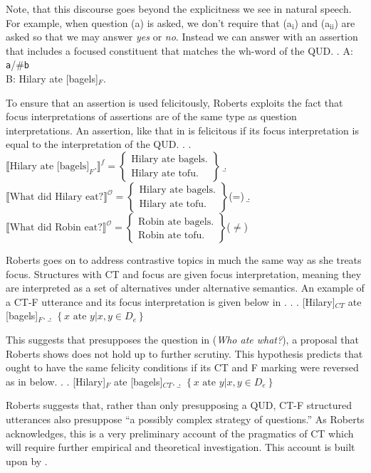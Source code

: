\documentclass[GPFinal]{subfiles}
\begin{document}
Note, that this discourse goes beyond the explicitness we see in natural speech.
For example, when question (a) is asked, we don't require that (a$_\text{i}$) and (a$_\text{ii}$) are asked so that we may answer \textit{yes} or \textit{no}.
Instead we can answer with an assertion that includes a focused constituent that matches the wh-word of the QUD.
\ex. A: \texttt{a}/\#\texttt{b}\\
B: Hilary ate [bagels]$_F$.

To ensure that an assertion is used felicitously, Roberts exploits the fact that focus interpretations of assertions are of the same type as question interpretations.
An assertion, like that in \Last is felicitous if its focus interpretation is equal to the interpretation of the QUD.
\ex.
\a.
$\llbracket\text{Hilary ate [bagels]}_F.\rrbracket^f = 
\begin{Bmatrix}
  \text{Hilary ate bagels.}\\
  \text{Hilary ate tofu.}
\end{Bmatrix}
$
\b.
$\llbracket\text{What did Hilary eat?}\rrbracket^\mathcal{O} =
\begin{Bmatrix}
  \text{Hilary ate bagels.}\\
  \text{Hilary ate tofu.}
\end{Bmatrix}
$\hfill (=\Last[a])
\b.
$\llbracket\text{What did Robin eat?}\rrbracket^\mathcal{O} =
\begin{Bmatrix}
  \text{Robin ate bagels.}\\
  \text{Robin ate tofu.}
\end{Bmatrix}
$\hfill ($\neq$\Last[a])

Roberts goes on to address contrastive topics in much the same way as she treats focus.
Structures with CT and focus are given focus interpretation, meaning they are interpreted as a set of alternatives under alternative semantics.
An example of a CT-F utterance and its focus interpretation is given below in \Next.
\ex.
\a. [Hilary]$_{CT}$ ate [bagels]$_F$.
\b. $\left\{ x\text{ ate }y | x,y \in D_e \right\}$

This suggests that \Last[a] presupposes the question in \Last[b] (\textit{Who ate what?}), a proposal that Roberts shows does not hold up to further scrutiny.
This hypothesis predicts that \Last[a] ought to have the same felicity conditions if its CT and F marking were reversed as in \Next below.
\ex. 
\a. [Hilary]$_F$ ate [bagels]$_{CT}$.
\b. $\left\{ x\text{ ate }y | x,y \in D_e \right\}$

Roberts suggests that, rather than only presupposing a QUD, CT-F structured utterances also presuppose ``a possibly complex strategy of questions.'' \parencite[][p.50]{roberts2012information}
As Roberts acknowledges, this is a very preliminary account of the pragmatics of CT which will require further empirical and theoretical investigation.
This account is built upon by \textcite{buring2003d,buringforthcomingtopic}.
\end{document}
